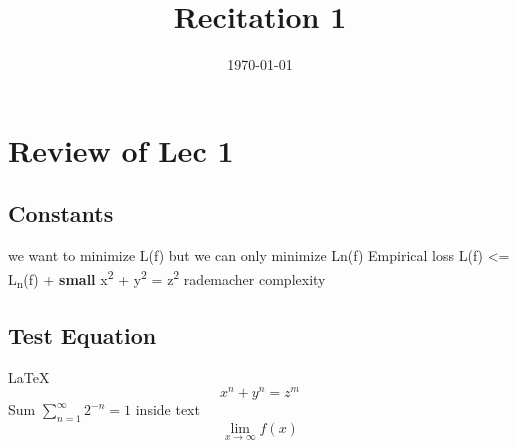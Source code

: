 \documentclass[11pt]{article}
\date{\today}
\title{Recitation 1}
\begin{document}
\maketitle
\tableofcontents


\section{Review of Lec 1}
\label{sec:orgc17e54f}
\subsection{Constants}
\label{sec:org3f21be8}
we want to minimize L(f) but we can only minimize Ln(f) Empirical loss
L(f) <= L\textsubscript{n}(f) + \textbf{small}
x\textsuperscript{2} + y\textsuperscript{2} = z\textsuperscript{2}
rademacher complexity
\subsection{Test Equation}
\label{sec:orge655882}
\LaTeX
\[ x^n + y^n = z^m \]
Sum $\sum_{n=1}^{\infty} 2^{-n} = 1$ inside text
\[ \lim_{x\to\infty} f(x) \]
\end{document}
